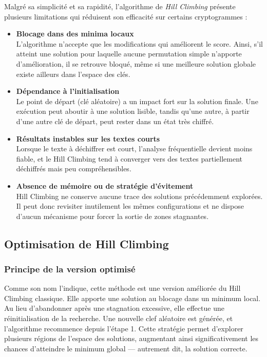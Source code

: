 \documentclass[a4paper]{article}
\begin{document}
Malgré sa simplicité et sa rapidité, l’algorithme de \textit{Hill Climbing} présente plusieurs limitations qui réduisent son efficacité sur certains cryptogrammes :

\begin{itemize}
    \item \textbf{Blocage dans des minima locaux} \\
    L’algorithme n’accepte que les modifications qui améliorent le score. Ainsi, s’il atteint une solution pour laquelle aucune permutation simple n’apporte d’amélioration, il se retrouve bloqué, même si une meilleure solution globale existe ailleurs dans l’espace des clés.

    \item \textbf{Dépendance à l'initialisation} \\
    Le point de départ (clé aléatoire) a un impact fort sur la solution finale. Une exécution peut aboutir à une solution lisible, tandis qu’une autre, à partir d’une autre clé de départ, peut rester dans un état très chiffré.

    \item \textbf{Résultats instables sur les textes courts} \\
    Lorsque le texte à déchiffrer est court, l’analyse fréquentielle devient moins fiable, et le Hill Climbing tend à converger vers des textes partiellement déchiffrés mais peu compréhensibles.

    \item \textbf{Absence de mémoire ou de stratégie d’évitement} \\
    Hill Climbing ne conserve aucune trace des solutions précédemment explorées. Il peut donc revisiter inutilement les mêmes configurations et ne dispose d’aucun mécanisme pour forcer la sortie de zones stagnantes.
\end{itemize}


\subsection{Optimisation de Hill Climbing}
\subsubsection{Principe de la version optimisé}

Comme son nom l’indique, cette méthode est une version améliorée du Hill Climbing classique. Elle apporte une solution au blocage dans un minimum local.
Au lieu d’abandonner après une stagnation excessive, elle effectue une réinitialisation de la recherche. Une nouvelle clef aléatoire est générée, et l’algorithme recommence depuis l’étape 1.
Cette stratégie permet d’explorer plusieurs régions de l’espace des solutions, augmentant ainsi significativement les chances d’atteindre le minimum global — autrement dit, la solution correcte.
\end{document}
